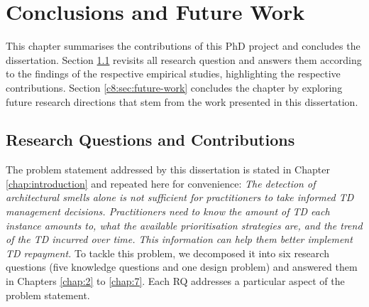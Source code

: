 \setlength{\headheight}{1.2cm}
\renewcommand{\publ}{\flushleft\footnotesize{}}

\chapter{Conclusions and Future Work}\label{chap:8}
This chapter summarises the contributions of this PhD project and concludes the dissertation.
Section \ref{c8:sec:rq-contributions} revisits all research question and answers them according to the findings of the respective empirical studies, highlighting the respective contributions.
Section \ref{c8:sec:future-work} concludes the chapter by exploring future research directions that stem from the work presented in this dissertation.

\section{Research Questions and Contributions}\label{c8:sec:rq-contributions}
The problem statement addressed by this dissertation is stated in Chapter \ref{chap:introduction} and repeated here for convenience: \textit{The detection of architectural smells alone is not sufficient for practitioners to take informed TD management decisions. Practitioners need to know the amount of TD each instance amounts to, what the available prioritisation strategies are, and the trend of the TD incurred over time. This information can help them better implement TD repayment.}
To tackle this problem, we decomposed it into six research questions (five knowledge questions and one design problem) and answered them in Chapters \ref{chap:2} to \ref{chap:7}.
Each RQ addresses a particular aspect of the problem statement.

